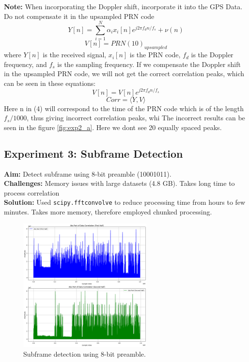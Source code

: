 \documentclass[12pt]{report}
\begin{document}
\textbf{Note: }When incorporating the Doppler shift, incorporate it into the GPS Data. Do not compensate it in the upsampled PRN code 
\begin{equation}
    Y[n] = \sum_{i=1}^{N} \alpha_i x_i[n] e^{j2\pi f_{d} n/f_{s}} + \nu(n)
\end{equation}
\begin{equation}
    V[n] = PRN(10)_{upsampled}
\end{equation}
where $Y[n]$ is the received signal, $x_i[n]$ is the PRN code, $f_d$ is the Doppler frequency, and $f_s$ is the sampling frequency.
If we compensate the Doppler shift in the upsampled PRN code, we will not get the correct correlation peaks, which can be seen in these equations:
\begin{equation}
    V[n] = V[n] e^{j2\pi f_{d} n/f_{s}}
\end{equation}
\begin{equation}
    Corr = \langle Y, V\rangle 
\end{equation}
Here n in (4) will correspond to the time of the PRN code which is of the length $f_s/1000$, thus giving incorrect correlation peaks, whi
The incorrect results can be seen in the figure \ref{fig:exp2_a}. Here we dont see 20 equally spaced peaks.

\subsection{Experiment 3: Subframe Detection}
\textbf{Aim:} Detect subframe using 8-bit preamble (10001011). \\
\textbf{Challenges:} Memory issues with large datasets (4.8 GB). Takes long time to process correlation \\
\textbf{Solution:} Used \texttt{scipy.fftconvolve} to reduce processing time from hours to few minutes. Takes more memory, therefore employed chunked processing.
\begin{figure}[H]
    \centering
    \includegraphics[width=0.6\textwidth]{exp3.png}
    \caption{Subframe detection using 8-bit preamble.}
    \label{fig:exp3}
\end{figure}
\end{document}
